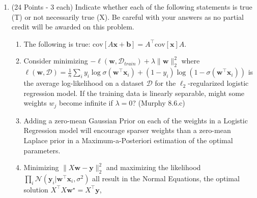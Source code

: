 \documentclass[letter, 12pt]{article}
\begin{document}
\begin{enumerate}
\item (24 Points - 3 each) Indicate whether each of the following
    statements is true (T) or not necessarily true (X).  Be careful with
    your answers as no partial credit will be awarded on this problem.
    \begin{enumerate}
    \item
         \parbox[t]{5in}{
      The following is true: $\mathrm{cov}[A\mathbf{x} + \mathbf{b}] = A^\top\mathrm{cov}[\mathbf{x}]A$.
    }
    \vspace{.3in}
    \item
       \parbox[t]{5in}{
      Consider minimizing $-\ell(\mathbf{w},\mathcal{D}_{train}) +
      \lambda\|\mathbf{w}\|_2^2$ where $\ell(\mathbf{w},\mathcal{D}) =
      \frac{1}{n}\sum_i y_i\log\sigma(\mathbf{w}^\top \mathbf{x}_i) + (1-y_i)\log(1 -
      \sigma(\mathbf{w}^\top\mathbf{x}_i))$ is the average
      log-likelihood on a dataset $\mathcal{D}$ for the $\ell_2$-regularized logistic
      regression model. If the training data is linearly separable, might some weights
      $w_j$ become infinite if $\lambda=0$? (Murphy 8.6.c)
    }
    \vspace{.3in}
    \item
       \parbox[t]{5in}{
      Adding a zero-mean Gaussian Prior on each of the weights in a Logistic Regression
      model will encourage sparser weights than a zero-mean Laplace prior in a Maximum-a-Posteriori
      estimation of the optimal parameters.
      }
    \vspace{.3in}
    \item
       \parbox[t]{5in}{
      Minimizing $\|X\mathbf{w} - \mathbf{y}\|_2^2$ and maximizing the likelihood
      $\prod_i \mathcal{N}(\mathbf{y}_i | \mathbf{w}^\top\mathbf{x}_i, \sigma^2)$ all
      result in the Normal Equations, the optimal solution $X^\top X\mathbf{w}^\star = X^\top \mathbf{y}$,
}
\end{enumerate}
\end{enumerate}
\end{document}
